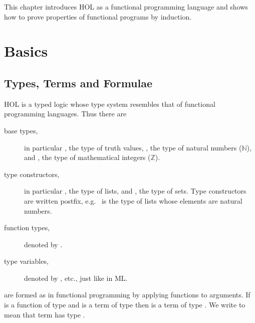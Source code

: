 %
\begin{isabellebody}%
\def\isabellecontext{Basics}%
%
\isadelimtheory
%
\endisadelimtheory
%
\isatagtheory
%
\endisatagtheory
{\isafoldtheory}%
%
\isadelimtheory
%
\endisadelimtheory
%
\begin{isamarkuptext}%
This chapter introduces HOL as a functional programming language and shows
how to prove properties of functional programs by induction.

\section{Basics}

\subsection{Types, Terms and Formulae}
\label{sec:TypesTermsForms}

HOL is a typed logic whose type system resembles that of functional
programming languages. Thus there are
\begin{description}
\item[base types,] 
in particular , the type of truth values,
, the type of natural numbers ($\mathbb{N}$), and ,
the type of mathematical integers ($\mathbb{Z}$).
\item[type constructors,]
 in particular , the type of
lists, and , the type of sets. Type constructors are written
postfix, e.g.\  is the type of lists whose elements are
natural numbers.
\item[function types,]
denoted by .
\item[type variables,]
  denoted by ,  etc., just like in ML\@.
\end{description}

 are formed as in functional programming by
applying functions to arguments. If  is a function of type
 and  is a term of type
 then  is a term of type . We write  to mean that term  has type .


\end{isamarkuptext}
\end{isabellebody}
